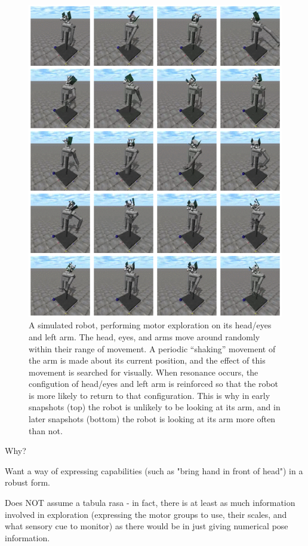 \begin{figure}[p]
\centerline{\includegraphics[width=\textwidth]{images/find-arm}}
\caption{
%
A simulated robot, performing motor exploration on its
head/eyes and left arm.  The head, eyes, and arms move around randomly
within their range of movement.
%
A periodic ``shaking'' movement of the arm is made about its
current position, and the effect of this movement is searched 
for visually.
%
When resonance occurs, the configution of head/eyes and left arm
is reinforced so that the robot is more likely to return to that
configuration.
%
This is why 
in early snapshots (top) the robot is unlikely to be looking at 
its arm, and in later snapshots (bottom) the robot is looking at
its arm more often than not.
%
}
\end{figure}

Why?

Want a way of expressing capabilities (such as "bring hand in front of head") in a robust form.

Does NOT assume a tabula rasa - in fact, there is at least as much information involved in exploration (expressing the motor groups to use, their scales, and what sensory cue to monitor) as there would be in just giving numerical pose information.

